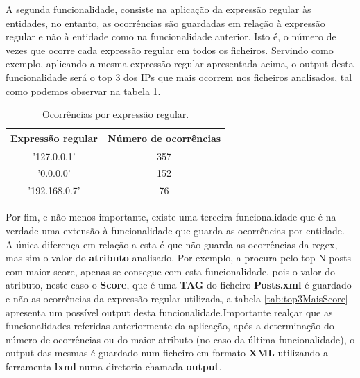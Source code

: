 \documentclass[11pt,a4paper]{report}%
\begin{document}
\newpage

A segunda funcionalidade, consiste na aplicação da expressão regular às entidades, no entanto, as ocorrências são guardadas em relação à expressão regular e não à entidade como na funcionalidade anterior. Isto é, o número de vezes que ocorre cada expressão regular em todos os ficheiros. Servindo como exemplo, aplicando a mesma expressão regular apresentada acima, o output desta funcionalidade será o top 3 dos IPs que mais ocorrem nos ficheiros analisados, tal como podemos observar na tabela \ref{tab:outputPorRegex}. 

\begin{table}[h!] %
\begin{center} %
\begin{tabular}{ | c | c | } %
  \hline  %
  Expressão regular &  Número de ocorrências \\
  \hline
  '127.0.0.1'  & 357 \\
  '0.0.0.0' & 152 \\
  '192.168.0.7' & 76 \\
  \hline
\end{tabular}
\end{center}
\caption{Ocorrências por expressão regular.} \label{tab:outputPorRegex}
\end{table}

Por fim, e não menos importante, existe uma terceira funcionalidade que é na verdade uma extensão à funcionalidade que guarda as ocorrências por entidade. A única diferença em relação a esta é que não guarda as ocorrências da regex, mas sim o valor do \textbf{atributo} analisado. \newline Por exemplo, a procura pelo top N posts com maior score, apenas se consegue com esta funcionalidade, pois o valor do atributo, neste caso o \textbf{Score}, que é uma \textbf{TAG} do ficheiro \textbf{Posts.xml} é guardado e não as ocorrências da expressão regular utilizada, a tabela \ref{tab:top3MaisScore} apresenta um possível output desta funcionalidade.\newline \newline Importante realçar que as funcionalidades referidas anteriormente da aplicação, após a determinação do número de ocorrências ou do maior atributo (no caso da última funcionalidade), o output das mesmas é guardado num ficheiro em formato \textbf{XML} utilizando a ferramenta \textbf{lxml} numa diretoria chamada \textbf{output}.
\end{document}
